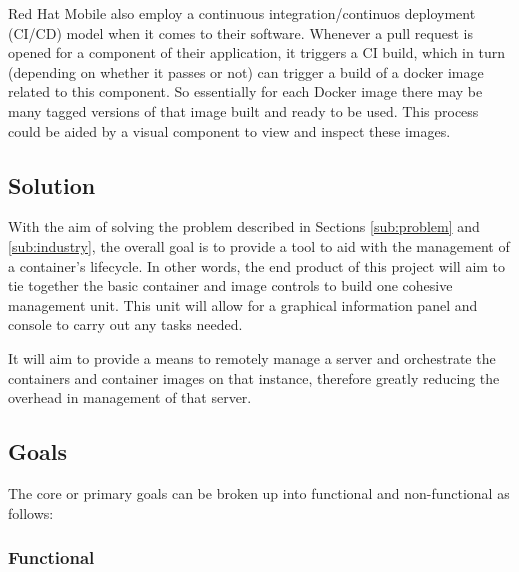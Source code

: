 Red Hat Mobile also employ a \gls{continuous integration}/\gls{continuos deployment} (CI/CD) model when it comes to their software. Whenever a pull request is opened for a component of their application, it triggers a CI build, which in turn (depending on whether it passes or not) can trigger a build of a \gls{docker image} related to this component. So essentially for each Docker image there may be many tagged versions of that image built and ready to be used. This process could be aided by a visual component to view and inspect these images.


\subsection{Solution}
With the aim of solving the problem described in Sections \ref{sub:problem} and \ref{sub:industry}, the overall goal is to provide a tool to aid with the management of a \gls{container}'s lifecycle. In other words, the end product of this project will aim to tie together the basic container and image controls to build one cohesive management unit. This unit will allow for a graphical information panel and console to carry out any tasks needed.

It will aim to provide a means to remotely manage a server and orchestrate the containers and container images on that instance, therefore greatly reducing the overhead in management of that server.

\subsection{Goals}
\label{sub:goals}
The core or primary goals can be broken up into functional and non-functional as follows:

\subsubsection{Functional}

